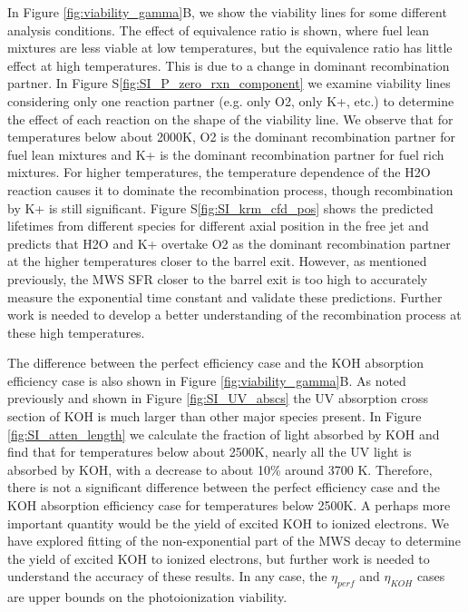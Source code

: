In Figure \ref{fig:viability_gamma}B, we show the viability lines for some different analysis conditions. The effect of equivalence ratio is shown, where fuel lean mixtures are less viable at low temperatures, but the equivalence ratio has little effect at high temperatures. This is due to a change in dominant recombination partner. In Figure S\ref*{fig:SI_P_zero_rxn_component} we examine viability lines considering only one reaction partner (e.g. only O2, only K+, etc.) to determine the effect of each reaction on the shape of the viability line. We observe that for temperatures below about 2000K, O2 is the dominant recombination partner for fuel lean mixtures and K+ is the dominant recombination partner for fuel rich mixtures. For higher temperatures, the temperature dependence of the H2O reaction causes it to dominate the recombination process, though recombination by K+ is still significant. Figure S\ref*{fig:SI_krm_cfd_pos} shows the predicted lifetimes from different species for different axial position in the free jet and predicts that H2O and K+ overtake O2 as the dominant recombination partner at the higher temperatures closer to the barrel exit. However, as mentioned previously, the MWS SFR closer to the barrel exit is too high to accurately measure the exponential time constant and validate these predictions. Further work is needed to develop a better understanding of the recombination process at these high temperatures.  

The difference between the perfect efficiency case and the KOH absorption efficiency case is also shown in Figure \ref{fig:viability_gamma}B. As noted previously and shown in Figure \ref*{fig:SI_UV_abscs} the UV absorption cross section of KOH is much larger than other major species present. In Figure \ref*{fig:SI_atten_length} we calculate the fraction of light absorbed by KOH and find that for temperatures below about 2500K, nearly all the UV light is absorbed by KOH, with a decrease to about 10\% around 3700 K. Therefore, there is not a significant difference between the perfect efficiency case and the KOH absorption efficiency case for temperatures below 2500K. A perhaps more important quantity would be the yield of excited KOH to ionized electrons. We have explored fitting of the non-exponential part of the MWS decay to determine the yield of excited KOH to ionized electrons, but further work is needed to understand the accuracy of these results. In any case, the $\eta_{perf}$ and $\eta_{KOH}$ cases are upper bounds on the photoionization viability.  

